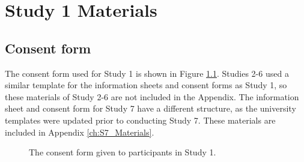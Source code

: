 \chapter{Study 1 Materials}\label{ch:S1_Materials}
\section{Consent form}\label{ch:consentform}
The consent form used for Study 1 is shown in Figure \ref{fig:consentform}. Studies 2-6 used a similar template for the information sheets and consent forms as Study 1, so these materials of Study 2-6 are not included in the Appendix. The information sheet and consent form for Study 7 have a different structure, as the university templates were updated prior to conducting Study 7. These materials are included in Appendix \ref{ch:S7_Materials}.

\begin{figure}[htp] 
\caption[Study 1 consent form]{The consent form given to participants in Study 1.}
\label{fig:consentform}
\end{figure} 

